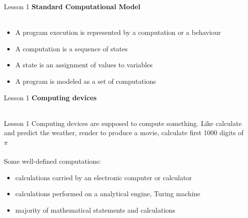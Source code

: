 \documentclass[aspectratio=1610]{beamer}
\begin{document}
\begin{frame}{Lesson 1}{}
\LARGE
\textbf{Standard Computational Model}\\~\\
\begin{itemize}
    \item A program execution is represented by a computation or a behaviour
    \item A computation is a sequence of states
    \item A state is an assignment of values to variables	
    \item A program is modeled as a set of computations
\end{itemize}

\end{frame}



\begin{frame}{Lesson 1}{}
\LARGE
\textbf{Computing devices}\\~\\

\end{frame}



\begin{frame}{Lesson 1}{}
\Large
Computing devices are supposed to compute something. Like calculate
and predict the weather, render to produce a movie, calculate first 1000 digits of $\pi$ \\~\\ 
Some well-defined computations:

\begin{itemize}
    \item calculations carried by an electronic computer or calculator
    \item calculations performed on a \alert{analytical engine}, \alert{Turing machine}
    \item majority of mathematical statements and calculations
\end{itemize}

\end{frame}
\end{document}
